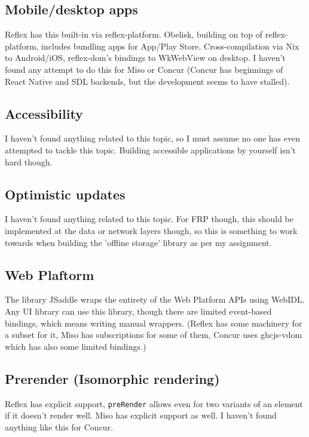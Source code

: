 \documentclass[english,odsaz]{fitthesis}
\begin{document}
\subsection{Mobile/desktop apps}
\label{sec:orgc8dbab7}
Reflex has this built-in via reflex-platform. Obelisk, building on top of
reflex-platform, includes bundling apps for App/Play Store. Cross-compilation via
Nix to Android/iOS, reflex-dom's bindings to WkWebView on desktop. I haven't
found any attempt to do this for Miso or Concur (Concur has beginnings of React
Native and SDL backends, but the development seems to have stalled).

\subsection{Accessibility}
\label{sec:orgbc6e532}
I haven't found anything related to this topic, so I must assume no one has even
attempted to tackle this topic. Building accessible applications by yourself
isn't hard though.

\subsection{Optimistic updates}
\label{sec:orgabf7642}
I haven't found anything related to this topic. For FRP though, this should be
implemented at the data or network layers though, so this is something to work
towards when building the 'offline storage' library as per my assignment.

\subsection{Web Plaftorm}
\label{sec:org4720514}
The library JSaddle wraps the entirety of the Web Platform APIs using
WebIDL. Any UI library can use this library, though there are limited
event-based bindings, which means writing manual wrappers. (Reflex has some
machinery for a subset for it, Miso has subscriptions for some of them, Concur
uses ghcjs-vdom which has also some limited bindings.)

\subsection{Prerender (Isomorphic rendering)}
\label{sec:org3690e0d}
Reflex has explicit support, \texttt{preRender} allows even for two variants of an
element if it doesn't render well. Miso has explicit support as well. I haven't
found anything like this for Concur.
\end{document}
